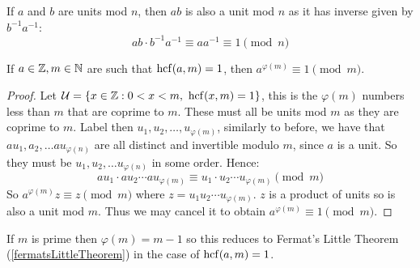 \documentclass[../main.tex]{subfiles}
\begin{document}
\begin{remark}
  If $a$ and $b$ are units mod $n$, then $ab$ is also a unit mod $n$ as it has inverse given by $b^{-1} a^{-1}$:
  \[
    ab \cdot b^{-1} a^{-1} \equiv aa^{-1} \equiv 1 \pmod{n}
  \]
\end{remark}
\begin{theorem}
  If $a \in \mathbb{Z}, m \in \mathbb{N}$ are such that $\operatorname{hcf}(a, m) = 1$, then $a^{\varphi(m)} \equiv 1 \pmod{m}$.
  \label{fermatEuler}
\end{theorem}
\begin{proof}
  Let $\mathcal{U} = \{x \in \mathbb{Z} : 0 < x < m,\ \operatorname{hcf}(x, m) = 1\}$, this is the $\varphi(m)$ numbers less than $m$ that are coprime to $m$.
  These must all be units mod $m$ as they are coprime to $m$.
  Label then $u_1, u_2, \ldots, u_{\varphi(m)}$, similarly to before, we have that $au_1, a_2, \ldots au_{\varphi(n)}$ are all distinct and invertible modulo $m$, since $a$ is a unit.
  So they must be $u_1, u_2, \ldots u_{\varphi(n)}$ in some order.
  Hence:
  \[
    au_1 \cdot au_2 \cdots au_{\varphi(m)} \equiv u_1 \cdot u_2 \cdots u_{\varphi(m)} \pmod{m}
  \]
  So $a^{\varphi(m)} z \equiv z \pmod{m}$ where $z = u_1 u_2 \cdots u_{\varphi(m)}$.
  $z$ is a product of units so is also a unit mod $m$.
  Thus we may cancel it to obtain $a^{\varphi(m)} \equiv 1 \pmod{m}$.
\end{proof}
\begin{remark}
  If $m$ is prime then $\varphi(m) = m - 1$ so this reduces to Fermat's Little Theorem (\cref{fermatsLittleTheorem}) in the case of $\operatorname{hcf}(a, m) = 1$.
\end{remark}
\end{document}
